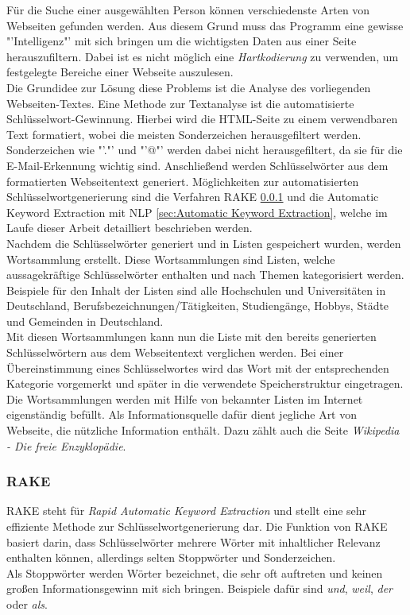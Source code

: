 	Für die Suche einer ausgewählten Person können verschiedenste Arten von Webseiten gefunden werden. Aus diesem Grund muss das Programm eine gewisse "'Intelligenz"' mit sich bringen um die wichtigsten Daten aus einer Seite herauszufiltern. Dabei ist es nicht möglich eine \textit{Hartkodierung} zu verwenden, um festgelegte Bereiche einer Webseite auszulesen.\\
	Die Grundidee zur Lösung diese Problems ist die Analyse des vorliegenden Webseiten-Textes. Eine Methode zur Textanalyse ist die automatisierte Schlüsselwort-Gewinnung. Hierbei wird die HTML-Seite zu einem verwendbaren Text formatiert, wobei die meisten Sonderzeichen herausgefiltert werden. Sonderzeichen wie "'."' und "'@"' werden dabei nicht herausgefiltert, da sie für die E-Mail-Erkennung wichtig sind. Anschließend werden Schlüsselwörter aus dem formatierten Webseitentext generiert. Möglichkeiten zur automatisierten Schlüsselwortgenerierung sind die Verfahren RAKE \ref{sec:RAKE} und die Automatic Keyword Extraction mit NLP \ref{sec:Automatic Keyword Extraction}, welche im Laufe dieser Arbeit detailliert beschrieben werden.\\
	Nachdem die Schlüsselwörter generiert und in Listen gespeichert wurden, werden Wortsammlung erstellt. Diese Wortsammlungen sind Listen, welche aussagekräftige Schlüsselwörter enthalten und nach Themen kategorisiert werden. Beispiele für den Inhalt der Listen sind alle Hochschulen und Universitäten in Deutschland, Berufsbezeichnungen/Tätigkeiten, Studiengänge, Hobbys, Städte und Gemeinden in Deutschland.\\
	Mit diesen Wortsammlungen kann nun die Liste mit den bereits generierten Schlüsselwörtern aus dem Webseitentext verglichen werden. Bei einer Übereinstimmung eines Schlüsselwortes wird das Wort mit der entsprechenden Kategorie vorgemerkt und später in die verwendete Speicherstruktur eingetragen. \\
	Die Wortsammlungen werden mit Hilfe von bekannter Listen im Internet eigenständig befüllt. Als Informationsquelle dafür dient jegliche Art von Webseite, die nützliche Information enthält. Dazu zählt auch die Seite \textit{Wikipedia - Die freie Enzyklopädie}.	
		\subsubsection{RAKE}
		\label{sec:RAKE}
		RAKE steht für \textit{Rapid Automatic Keyword Extraction} und stellt eine sehr effiziente Methode zur Schlüsselwortgenerierung dar. Die Funktion von RAKE basiert darin, dass Schlüsselwörter mehrere Wörter mit inhaltlicher Relevanz enthalten können, allerdings selten Stoppwörter und Sonderzeichen.\cite{rose2010automatic}\\
		Als Stoppwörter werden Wörter bezeichnet, die sehr oft auftreten und keinen großen Informationsgewinn mit sich bringen. Beispiele dafür sind \textit{und}, \textit{weil}, \textit{der} oder \textit{als}.\cite{Stopwords}\\
		
